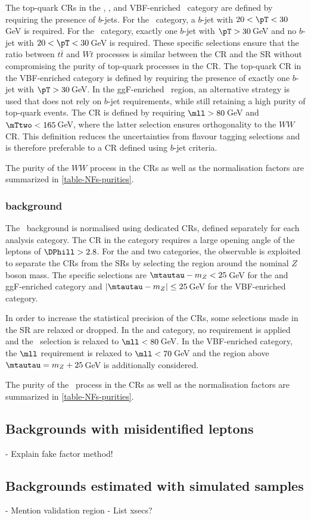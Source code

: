 The top-quark CRs in the \ZeroJet, \OneJet, and VBF-enriched \TwoJet\ category are defined by requiring the presence of $b$-jets. 
For the \ZeroJet\ category, a $b$-jet with $20 < \pT < 30\,$GeV is required.
For the \OneJet\ category, exactly one $b$-jet with $\pT > 30\,$GeV and no $b$-jet with $20 < \pT < 30\,$GeV is required. These specific selections ensure that the ratio between $t\bar{t}$ and $Wt$ processes is similar between the CR and the SR without compromising the purity of top-quark processes in the CR.
The top-quark CR in the VBF-enriched \TwoJet category is defined by requiring the presence of exactly one $b$-jet with $\pT > 30\,$GeV.
In the ggF-enriched \TwoJet\ region, an alternative strategy is used that does not rely on $b$-jet requirements, while still retaining a high purity of top-quark events. The CR is defined by requiring $\mll > 80\,$GeV and $\mTtwo < 165\,$GeV, where the latter selection ensures orthogonality to the $WW$ CR. This definition reduces the uncertainties from flavour tagging selections and is therefore preferable to a CR defined using $b$-jet criteria.

The purity of the $WW$ process in the CRs as well as the normalisation factors are summarized in \cref{table-NFs-purities}.

\subsubsection{\Ztautau background}
The \Ztautau\ background is normalised using dedicated CRs, defined separately for each analysis category. 
The CR in the \ZeroJet category requires a large opening angle of the leptons of $\DPhill > 2.8$.
For the \OneJet and two \TwoJet categories, the \mtautau observable is exploited to separate the \Ztautau CRs from the SRs by selecting the region around the nominal $Z$ boson mass.
The specific selections are $\mtautau - m_Z < 25\,$GeV for the \OneJet and ggF-enriched \TwoJet category and $|\mtautau - m_Z| \le 25\,$GeV for the VBF-enriched \TwoJet category. 

In order to increase the statistical precision of the CRs, some selections made in the SR are relaxed or dropped.
In the \ZeroJet and \OneJet category, no \pTmiss requirement is applied and the \mll\ selection is relaxed to $\mll < 80\,$GeV. 
In the VBF-enriched \TwoJet category, the $\mll$ requirement is relaxed to $\mll < 70\,$GeV and the region above $\mtautau = m_Z + 25\,$GeV is additionally considered.

The purity of the \Ztautau\ process in the CRs as well as the normalisation factors are summarized in \cref{table-NFs-purities}.


\subsection{Backgrounds with misidentified leptons}
- Explain fake factor method!

\subsection{Backgrounds estimated with simulated samples}
- Mention validation region
- List xsecs?